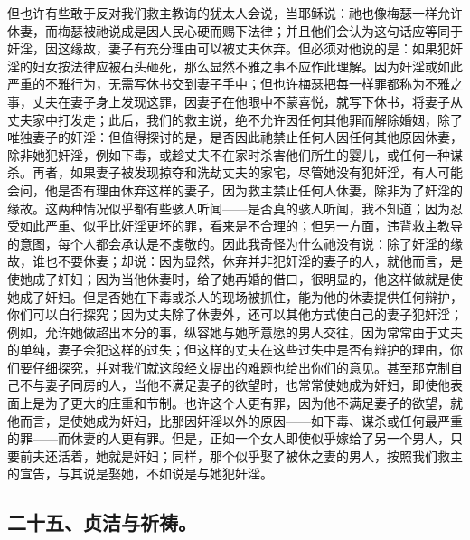 但也许有些敢于反对我们救主教诲的犹太人会说，当耶稣说：祂也像梅瑟一样允许休妻，而梅瑟被祂说成是因人民心硬而赐下法律；并且他们会认为这句话应等同于奸淫，因这缘故，妻子有充分理由可以被丈夫休弃。但必须对他说的是：如果犯奸淫的妇女按法律应被石头砸死，那么显然不雅之事不应作此理解。因为奸淫或如此严重的不雅行为，无需写休书交到妻子手中；但也许梅瑟把每一样罪都称为不雅之事，丈夫在妻子身上发现这罪，因妻子在他眼中不蒙喜悦，就写下休书，将妻子从丈夫家中打发走；此后，我们的救主说，绝不允许因任何其他罪而解除婚姻，除了唯独妻子的奸淫：但值得探讨的是，是否因此祂禁止任何人因任何其他原因休妻，除非她犯奸淫，例如下毒，或趁丈夫不在家时杀害他们所生的婴儿，或任何一种谋杀。再者，如果妻子被发现掠夺和洗劫丈夫的家宅，尽管她没有犯奸淫，有人可能会问，他是否有理由休弃这样的妻子，因为救主禁止任何人休妻，除非为了奸淫的缘故。这两种情况似乎都有些骇人听闻——是否真的骇人听闻，我不知道；因为忍受如此严重、似乎比奸淫更坏的罪，看来是不合理的；但另一方面，违背救主教导的意图，每个人都会承认是不虔敬的。因此我奇怪为什么祂没有说：除了奸淫的缘故，谁也不要休妻；却说：因为显然，休弃并非犯奸淫的妻子的人，就他而言，是使她成了奸妇；因为当他休妻时，给了她再婚的借口，很明显的，他这样做就是使她成了奸妇。但是否她在下毒或杀人的现场被抓住，能为他的休妻提供任何辩护，你们可以自行探究；因为丈夫除了休妻外，还可以其他方式使自己的妻子犯奸淫；例如，允许她做超出本分的事，纵容她与她所意愿的男人交往，因为常常由于丈夫的单纯，妻子会犯这样的过失；但这样的丈夫在这些过失中是否有辩护的理由，你们要仔细探究，并对我们就这段经文提出的难题也给出你们的意见。甚至那克制自己不与妻子同房的人，当他不满足妻子的欲望时，也常常使她成为奸妇，即使他表面上是为了更大的庄重和节制。也许这个人更有罪，因为他不满足妻子的欲望，就他而言，是使她成为奸妇，比那因奸淫以外的原因——如下毒、谋杀或任何最严重的罪——而休妻的人更有罪。但是，正如一个女人即使似乎嫁给了另一个男人，只要前夫还活着，她就是奸妇；同样，那个似乎娶了被休之妻的男人，按照我们救主的宣告，与其说是娶她，不如说是与她犯奸淫。\par


\subsection{二十五、贞洁与祈祷。}

